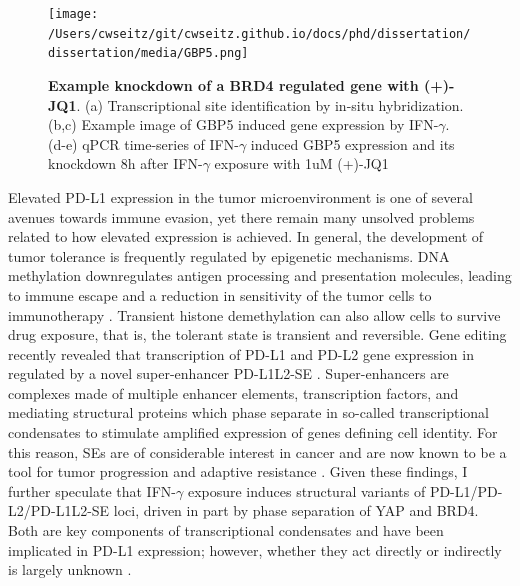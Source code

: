 \begin{figure}[t]
\texttt{[image: /Users/cwseitz/git/cwseitz.github.io/docs/phd/dissertation/dissertation/media/GBP5.png]}
\caption{\textbf{Example knockdown of a BRD4 regulated gene with (+)-JQ1}. (a) Transcriptional site identification by in-situ hybridization. (b,c) Example image of GBP5 induced gene expression by IFN-$\gamma$. (d-e) qPCR time-series of IFN-$\gamma$ induced GBP5 expression and its knockdown 8h after IFN-$\gamma$ exposure with 1uM (+)-JQ1}
\label{fig:fig31}
\end{figure}

Elevated PD-L1 expression in the tumor microenvironment is one of several avenues towards immune evasion, yet there remain many unsolved problems related to how elevated expression is achieved.  In general, the development of tumor tolerance is frequently regulated by epigenetic mechanisms. DNA methylation downregulates antigen processing and presentation molecules, leading to immune escape and a reduction in sensitivity of the tumor cells to immunotherapy \parencite{Li2021}. Transient histone demethylation can also allow cells to survive drug exposure, that is, the tolerant state is transient and reversible. Gene editing recently revealed that transcription of PD-L1 and PD-L2 gene expression in regulated by a novel super-enhancer PD-L1L2-SE \parencite{Xu2019}. Super-enhancers are complexes made of multiple enhancer elements, transcription factors, and mediating structural proteins which phase separate in so-called transcriptional condensates to stimulate amplified expression of genes defining cell identity. For this reason, SEs are of considerable interest in cancer and are now known to be a tool for tumor progression and adaptive resistance \parencite{Xu2019}. Given these findings, I further speculate that IFN-$\gamma$ exposure induces structural variants of PD-L1/PD-L2/PD-L1L2-SE loci, driven in part by phase separation of YAP and BRD4. Both are key components of transcriptional condensates and have been implicated in PD-L1 expression; however, whether they act directly or indirectly is largely unknown \parencite{Xu2019,Yu2021}.

